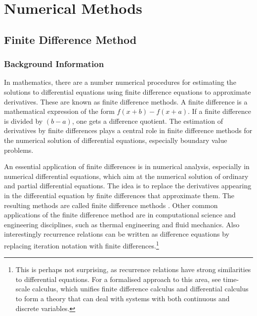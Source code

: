 \documentclass[aps,twocolumn,pre,nofootinbib,10pt]{revtex4-1}
\begin{document}
\section{Numerical Methods \label{sec:met}}

 
\subsection{Finite Difference Method}

\subsubsection{Background Information}

\par\hspace{4mm} In mathematics, there are a number numerical procedures for estimating the solutions to differential equations using finite difference equations to approximate derivatives. These are known as finite difference methods. A finite difference is a mathematical expression of the form \(f(x + b) - f(x + a)\). If a finite difference is divided by \((b - a)\), one gets a difference quotient. The estimation of derivatives by finite differences plays a central role in finite difference methods for the numerical solution of differential equations, especially boundary value problems.
\vspace{5mm} \par \indent An essential application of finite differences is in numerical analysis, especially in numerical differential equations, which aim at the numerical solution of ordinary and partial differential equations. The idea is to replace the derivatives appearing in the differential equation by finite differences that approximate them. The resulting methods are called finite difference methods \cite{compmethods}. Other common applications of the finite difference method are in computational science and engineering disciplines, such as thermal engineering and fluid mechanics. Also interestingly recurrence relations can be written as difference equations by replacing iteration notation with finite differences.\footnote{This is perhaps not surprising, as recurrence relations have strong similarities to differential equations. For a formalised approach to this area, see time-scale calculus, which unifies finite difference calculus and differential calculus to form a theory that can deal with 
systems with both 
continuous and discrete variables.}
\end{document}
